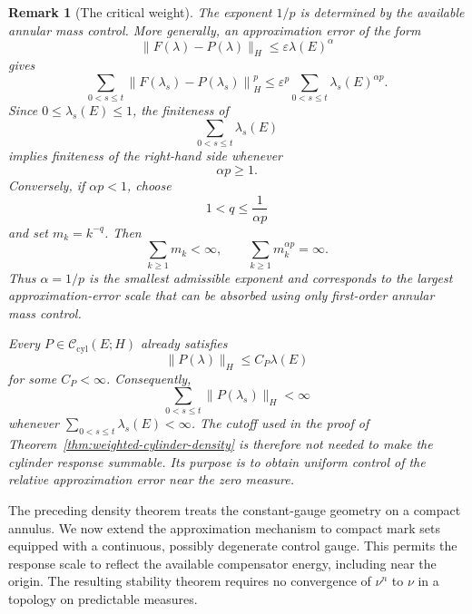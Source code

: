 \documentclass[a4paper,10pt]{article}
\newtheorem{rema}[thm]{Remark}
\begin{document}
\begin{rema}[The critical weight]
The exponent \(1/p\) is determined by the available annular mass
control. More generally, an approximation error of the form
\[
        \lVert F(\lambda)-P(\lambda)\rVert_H
        \le
        \varepsilon\lambda(E)^\alpha
\]
gives
\[
\sum_{0<s\le t}
\left\lVert
F(\lambda_s)-P(\lambda_s)
\right\rVert_H^p
\le
\varepsilon^p
\sum_{0<s\le t}\lambda_s(E)^{\alpha p}.
\]
Since \(0\le\lambda_s(E)\le1\), the finiteness of
\[
        \sum_{0<s\le t}\lambda_s(E)
\]
implies finiteness of the right-hand side whenever
\[
        \alpha p\ge1.
\]
Conversely, if \(\alpha p<1\), choose
\[
        1<q\le\frac1{\alpha p}
\]
and set \(m_k=k^{-q}\). Then
\[
        \sum_{k\ge1}m_k<\infty,
        \qquad
        \sum_{k\ge1}m_k^{\alpha p}=\infty.
\]
Thus \(\alpha=1/p\) is the smallest admissible exponent and corresponds
to the largest approximation-error scale that can be absorbed using
only first-order annular mass control.

Every \(P\in\mathcal C_{\mathrm{cyl}}(E;H)\) already satisfies
\[
        \lVert P(\lambda)\rVert_H
        \le
        C_P\lambda(E)
\]
for some \(C_P<\infty\). Consequently,
\[
\sum_{0<s\le t}\lVert P(\lambda_s)\rVert_H
<
\infty
\]
whenever \(\sum_{0<s\le t}\lambda_s(E)<\infty\). The cutoff used in
the proof of Theorem~\ref{thm:weighted-cylinder-density} is therefore
not needed to make the cylinder response summable. Its purpose is to
obtain uniform control of the relative approximation error near the
zero measure.
\end{rema}

The preceding density theorem treats the constant-gauge geometry on a
compact annulus. We now extend the approximation mechanism to compact
mark sets equipped with a continuous, possibly degenerate control
gauge. This permits the response scale to reflect the available
compensator energy, including near the origin. The resulting stability
theorem requires no convergence of \(\nu^n\) to \(\nu\) in a topology
on predictable measures.
\end{document}
